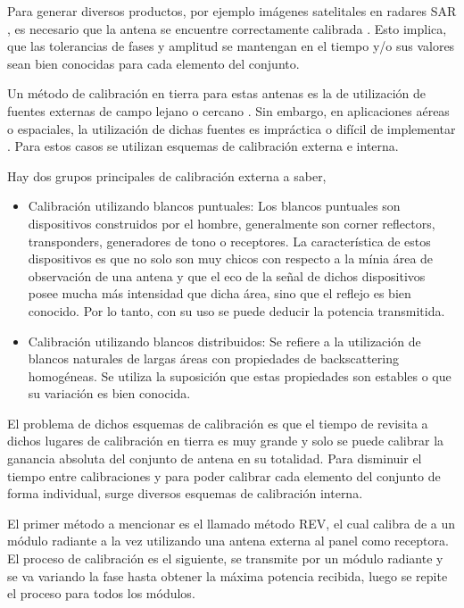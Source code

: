 Para generar diversos productos, por ejemplo imágenes satelitales en radares SAR \cite{Freeman1992}, es necesario que la 
antena se encuentre correctamente calibrada \cite{Luscombe1990}\cite{Seifert1996}\cite{Dall1994}. Esto implica, que las 
tolerancias de fases y amplitud se mantengan en el tiempo y/o sus valores sean bien conocidas para cada elemento del conjunto. 

Un método de calibración en tierra para estas antenas es la de utilización de fuentes externas de campo lejano o cercano 
\cite{Agrawal2003}. Sin embargo, en aplicaciones aéreas o espaciales, la utilización de dichas fuentes es impráctica o 
difícil de implementar \cite{Aumann1989}. Para estos casos se utilizan esquemas de calibración externa e interna.

Hay dos grupos principales de calibración externa a saber, 
\begin{itemize}
	\item Calibración utilizando blancos puntuales: Los blancos puntuales son dispositivos construidos por el hombre, generalmente 
		son corner reflectors, transponders, generadores de tono o receptores. La característica de estos dispositivos es que no 
		solo son muy chicos con respecto a la mínia área de observación de una antena y que el eco de la señal de dichos 
		dispositivos posee mucha más intensidad que dicha área, sino que el reflejo es bien conocido. Por lo tanto, con su uso 
		se puede deducir la potencia transmitida.
	\item Calibración utilizando blancos distribuidos: Se refiere a la utilización de blancos naturales de largas áreas con 
		propiedades de backscattering homogéneas. Se utiliza la suposición que estas propiedades son estables o que su variación es 
		bien conocida.
\end{itemize}

El problema de dichos esquemas de calibración es que el tiempo de revisita a dichos lugares de calibración en tierra es muy 
grande y solo se puede calibrar la ganancia absoluta del conjunto de antena en su totalidad. Para disminuir el tiempo entre 
calibraciones y para poder calibrar cada elemento del conjunto de forma individual, surge diversos esquemas de calibración 
interna. 

El primer método a mencionar es el llamado método REV, el cual calibra de a un módulo radiante a la vez utilizando una 
antena externa al panel como receptora. El proceso de calibración es el siguiente, se transmite por un módulo radiante
y se va variando la fase hasta obtener la máxima potencia recibida, luego se repite el proceso para todos los módulos. 

